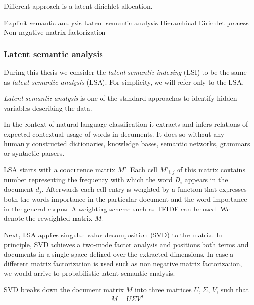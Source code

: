     Different approach is a latent dirichlet allocation.
    
    Explicit semantic analysis
    Latent semantic analysis
    Hierarchical Dirichlet process
    Non-negative matrix factorization
    
    
    \subsubsection{Latent semantic analysis}
    
    During this thesis we consider the \emph{latent semantic indexing} (LSI) to be the same as \emph{latent semantic analysis} (LSA).
    For simplicity, we will refer only to the LSA.
    
    \emph{Latent semantic analysis} is one of the standard approaches to identify hidden variables describing the data.
    
    In the context of natural language classification it extracts and infers relations of expected contextual usage of words in documents.
    It does so without any humanly constructed dictionaries, knowledge bases, semantic networks, grammars or syntactic parsers.
    
    LSA starts with a coocurence matrix $M'$. 
    Each cell $M'_{i,j}$ of this matrix contains number representing the frequency with  which  the  word $D_i$ appears in the document $d_j$.
    Afterwards each cell entry is weighted by a function that expresses both the words importance in the particular document and the word importance in the general corpus.
    A weighting scheme such as TFIDF can be used.
    We denote the reweighted matrix $M$. 
    
    Next, LSA applies singular value decomposition (SVD) to the matrix.
    In principle, SVD achieves a two-mode factor analysis and positions both terms and documents in a single space defined over the extracted dimensions.
    In case a different matrix factorization is used such as non negative matrix factorization, we would arrive to probabilistic latent semantic analysis.
    
    SVD breaks down the document matrix $M$ into three matrices $U$, $\Sigma$, $V$,\cite{papadimitriou2000latent} %
    \cite{deerwester1990indexing} %
    \cite{maas2011learning} %
    \cite{wiemer2004latent} %
    \cite{landauer1998introduction} %
    such that $$M=U \Sigma V^T$$ 

